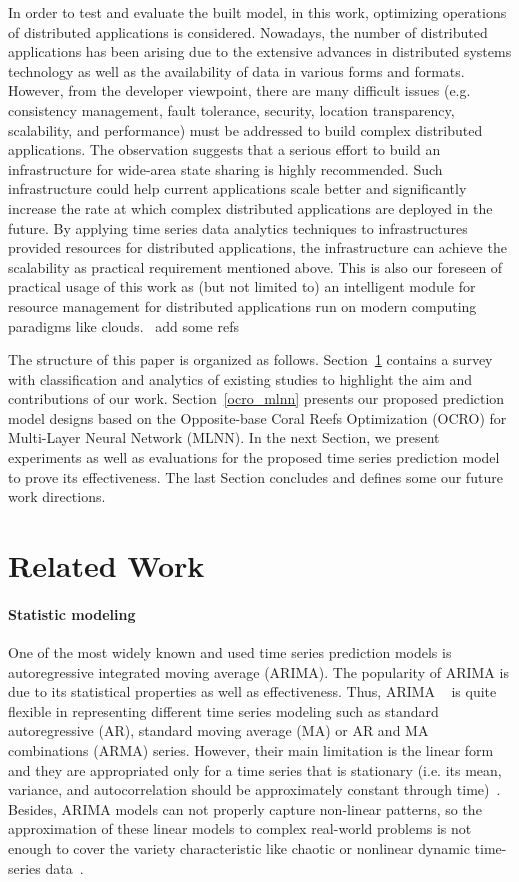 \documentclass[review,3p,authoryear]{elsarticle}
\def \GN#1{\textcolor{tn_orange}{~#1}}			%
\begin{document}
In order to test and evaluate the built model, in this work, optimizing operations of distributed applications is considered. Nowadays, the number of distributed applications has been arising due to the extensive advances in distributed systems technology as well as the availability of data in various forms and formats. However, from the developer viewpoint, there are many difficult issues (e.g. consistency management, fault tolerance, security, location transparency, scalability, and performance) must be addressed to build complex distributed applications. The observation suggests that a serious effort to build an infrastructure for wide-area state sharing is highly recommended. Such infrastructure could help current applications scale better and significantly increase the rate at which complex distributed applications are deployed in the future. By applying time series data analytics techniques to infrastructures provided resources for distributed applications, the infrastructure can achieve the scalability as practical requirement mentioned above. This is also our foreseen of practical usage of this work as (but not limited to) an intelligent module for resource management for distributed applications run on modern computing paradigms like clouds. \GN{add some refs}

The structure of this paper is organized as follows. Section~\ref{related_work} contains a survey with classification and analytics of existing studies to highlight the aim and contributions of our work. Section~\ref{ocro_mlnn} presents our proposed prediction model designs based on the Opposite-base Coral Reefs Optimization (OCRO) for Multi-Layer Neural Network (MLNN). In the next Section, we present experiments as well as evaluations for the proposed time series prediction model to prove its effectiveness. The last Section concludes and defines some our future work directions.


\section{Related Work}
\label{related_work}

\paragraph{Statistic modeling} 
One of the most widely known and used time series prediction models is autoregressive integrated moving average (ARIMA). The popularity of ARIMA is due to its statistical properties as well as effectiveness. Thus, ARIMA ~\citep{ref_mckenzie} is quite flexible in representing different time series modeling such as standard autoregressive (AR), standard moving average (MA) or AR and MA combinations (ARMA) series. However, their main limitation is the linear form and they are appropriated only for a time series that is stationary (i.e. its mean, variance, and autocorrelation should be approximately constant through time)~\citep{petricua2016limitation}. Besides, ARIMA models can not properly capture non-linear patterns, so the approximation of these linear models to complex real-world problems is not enough to cover the variety characteristic like chaotic or nonlinear dynamic time-series data~\citep{kajitani2005forecasting}. 
\end{document}
